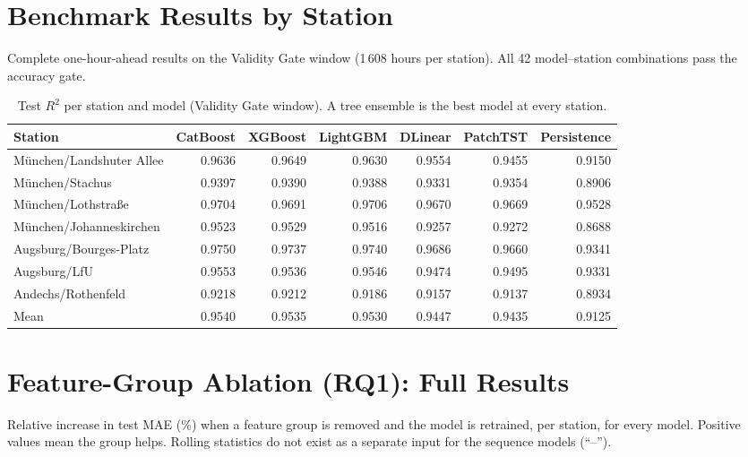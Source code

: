 \FloatBarrier
\section{Benchmark Results by Station}
\label{app:phase1}

Complete one-hour-ahead results on the Validity Gate window (1\,608 hours per station). All 42 model--station combinations pass the accuracy gate.


\begin{table}[!htbp]
\centering\footnotesize\setlength{\tabcolsep}{4pt}
\caption{Test $R^2$ per station and model (Validity Gate window). A tree ensemble is the best model at every station.}
\label{tab:app-p1-r2}
\begin{tabular}{lrrrrrr}
\toprule
Station & CatBoost & XGBoost & LightGBM & DLinear & PatchTST & Persistence \\
\midrule
M\"unchen/Landshuter Allee & 0.9636 & 0.9649 & 0.9630 & 0.9554 & 0.9455 & 0.9150 \\
M\"unchen/Stachus & 0.9397 & 0.9390 & 0.9388 & 0.9331 & 0.9354 & 0.8906 \\
M\"unchen/Lothstra{\ss}e & 0.9704 & 0.9691 & 0.9706 & 0.9670 & 0.9669 & 0.9528 \\
M\"unchen/Johanneskirchen & 0.9523 & 0.9529 & 0.9516 & 0.9257 & 0.9272 & 0.8688 \\
Augsburg/Bourges-Platz & 0.9750 & 0.9737 & 0.9740 & 0.9686 & 0.9660 & 0.9341 \\
Augsburg/LfU & 0.9553 & 0.9536 & 0.9546 & 0.9474 & 0.9495 & 0.9331 \\
Andechs/Rothenfeld & 0.9218 & 0.9212 & 0.9186 & 0.9157 & 0.9137 & 0.8934 \\
\midrule
Mean & 0.9540 & 0.9535 & 0.9530 & 0.9447 & 0.9435 & 0.9125 \\
\bottomrule
\end{tabular}
\end{table}


\FloatBarrier
\section{Feature-Group Ablation (RQ1): Full Results}
\label{app:rq1}

Relative increase in test MAE (\%) when a feature group is removed and the model is retrained, per station, for every model. Positive values mean the group helps. Rolling statistics do not exist as a separate input for the sequence models (``--'').


